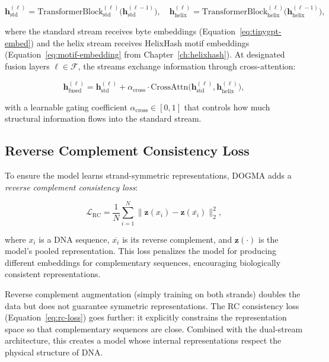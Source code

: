 \begin{equation}
\mathbf{h}_{\text{std}}^{(\ell)} = \text{TransformerBlock}_{\text{std}}^{(\ell)}\bigl(\mathbf{h}_{\text{std}}^{(\ell-1)}\bigr), \quad
\mathbf{h}_{\text{helix}}^{(\ell)} = \text{TransformerBlock}_{\text{helix}}^{(\ell)}\bigl(\mathbf{h}_{\text{helix}}^{(\ell-1)}\bigr),
\label{eq:dual-stream}
\end{equation}

where the standard stream receives byte embeddings (Equation~\ref{eq:tinygpt-embed}) and the helix stream receives HelixHash motif embeddings (Equation~\ref{eq:motif-embedding} from Chapter~\ref{ch:helixhash}). At designated fusion layers $\ell \in \mathcal{F}$, the streams exchange information through cross-attention:

\begin{equation}
\mathbf{h}_{\text{fused}}^{(\ell)} = \mathbf{h}_{\text{std}}^{(\ell)} + \alpha_{\text{cross}} \cdot \text{CrossAttn}\bigl(\mathbf{h}_{\text{std}}^{(\ell)}, \mathbf{h}_{\text{helix}}^{(\ell)}\bigr),
\label{eq:helix-fusion}
\end{equation}

with a learnable gating coefficient $\alpha_{\text{cross}} \in [0, 1]$ that controls how much structural information flows into the standard stream.

\subsection{Reverse Complement Consistency Loss}

To ensure the model learns strand-symmetric representations, DOGMA adds a \emph{reverse complement consistency loss}:

\begin{equation}
\mathcal{L}_{\mathrm{RC}} = \frac{1}{N} \sum_{i=1}^{N} \bigl\| \mathbf{z}(x_i) - \mathbf{z}(\overline{x_i}) \bigr\|_2^2,
\label{eq:rc-loss}
\end{equation}

where $x_i$ is a DNA sequence, $\overline{x_i}$ is its reverse complement, and $\mathbf{z}(\cdot)$ is the model's pooled representation. This loss penalizes the model for producing different embeddings for complementary sequences, encouraging biologically consistent representations.

\begin{keyinsight}
Reverse complement augmentation (simply training on both strands) doubles the data but does not guarantee symmetric representations. The RC consistency loss (Equation~\ref{eq:rc-loss}) goes further: it explicitly constrains the representation space so that complementary sequences are close. Combined with the dual-stream architecture, this creates a model whose internal representations respect the physical structure of DNA.
\end{keyinsight}

